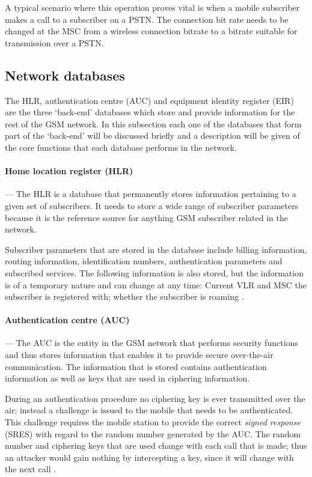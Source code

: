 A typical scenario where this operation proves vital is when a mobile subscriber makes a call to a subscriber on a PSTN. The connection bit rate needs to be changed at the MSC from a wireless connection bitrate to a bitrate suitable for transmission over a PSTN.

\subsection{Network databases}
The HLR, authentication centre (AUC) and equipment identity register (EIR) are the three `back-end' databases which store and provide information for the rest of the GSM network. In this subsection each one of the databases that form part of the `back-end' will be discussed briefly and a description will be given of the core functions that each database performs in the network.

\paragraph{Home location register (HLR)}
--- The HLR is a database that permanently stores information pertaining to a given set of subscribers. It needs to store a wide range of subscriber parameters because it is the reference source for anything GSM subscriber related in the network. 

Subscriber parameters that are stored in the database include billing information, routing information, identification numbers, authentication parameters and subscribed services. The following information is also stored, but the information is of a temporary nature and can change at any time: Current VLR and MSC the subscriber is registered with; whether the subscriber is roaming \cite{GSMSysEngin}.

\paragraph{Authentication centre (AUC)}
--- The AUC is the entity in the GSM network that performs security functions and thus stores information that enables it to provide secure over-the-air communication\cite{GSM92,GSMSysEngin}. The information that is stored contains authentication information as well as keys that are used in ciphering information\cite{GSM92,GSMSysEngin}.

During an authentication procedure no ciphering key is ever transmitted over the air; instead a challenge is issued to the mobile that needs to be authenticated. This challenge requires the mobile station to provide the correct \emph{signed response} (SRES) with regard to the random number generated by the AUC\cite{GSM92,GSMSysEngin}. The random number and ciphering keys that are used change with each call that is made; thus an attacker would gain nothing by intercepting a key, since it will change with the next call \cite{GSMSysEngin}.

